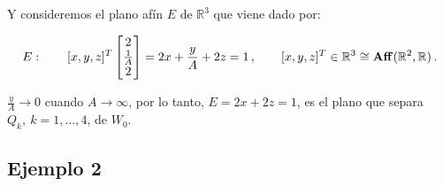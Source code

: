 

Y consideremos el plano af\'in $E$ de $\mathbb{R}^3$ que viene
dado por:

$$
E:\qquad
[x,y,z]^T \begin{bmatrix} 2 \\  \frac{1}{A} \\ 2 \end{bmatrix}
= 2x+\frac{y}{A} +2z = 1\,,\qquad 
[x,y,z]^T\in\mathbb{R}^3 \cong {\rm\bf Aff}(\mathbb{R}^2,\mathbb{R})\,.
$$

$\frac{y}{A} \rightarrow 0$ cuando $A \rightarrow \infty$, por lo tanto,
$E = 2x +2z=1$, es el plano que separa $Q_k,  \ k=1, \ldots, 4$, de
$W_0$.





\subsection{Ejemplo 2}

